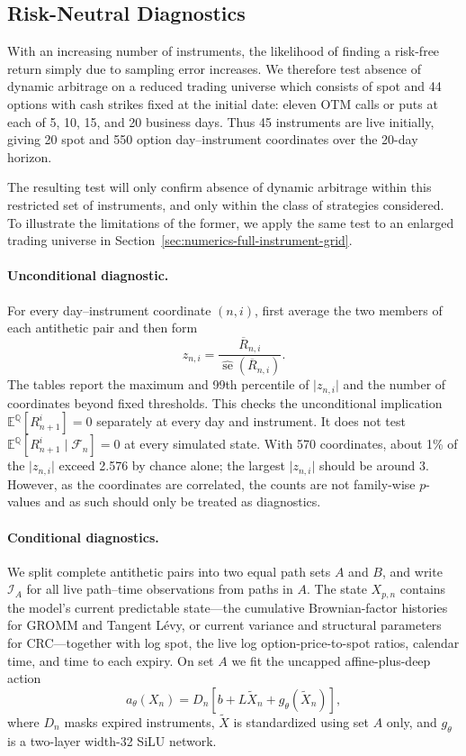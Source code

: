 \documentclass[11pt]{article}
\newcommand{\E}{\mathbb E}
\newcommand{\Q}{\mathbb Q}
\newcommand{\abs}[1]{\lvert #1\rvert}
\theoremstyle{plain}
\theoremstyle{definition}
\theoremstyle{remark}
\begin{document}
\subsection{Risk-Neutral Diagnostics}
\label{sec:numerics-audit-definition}
With an increasing number of instruments, the likelihood of finding a risk-free return simply due to sampling error increases. We therefore test absence of dynamic arbitrage on a reduced trading universe which consists of spot and
44 options with cash strikes fixed at the initial date: eleven OTM calls or
puts at each of 5, 10, 15, and 20 business days.  Thus 45 instruments are live
initially, giving 20 spot and 550 option day--instrument coordinates over the
20-day horizon. 

The resulting test will only confirm absence of dynamic arbitrage within this restricted set of instruments, 
and only within the class of strategies considered. To illustrate the limitations of the former,
we apply the same test to an enlarged trading universe
in Section~\ref{sec:numerics-full-instrument-grid}.

\paragraph{Unconditional diagnostic.}
For every day--instrument coordinate $(n,i)$, first average the two members of
each antithetic pair and then form
\begin{equation}\label{eq:numerics-z-score}
  z_{n,i}
  =\frac{\overline R_{n,i}}
  {\widehat{\operatorname{se}}(\overline R_{n,i})}.
\end{equation}
The tables report the maximum and 99th percentile of $\abs{z_{n,i}}$ and the
number of coordinates beyond fixed thresholds.  This checks the unconditional
implication $\E^\Q[R_{n+1}^i]=0$ separately at every day and instrument.  It
does not test $\E^\Q[R_{n+1}^i\mid\mathcal F_n]=0$ at every simulated state.
With 570 coordinates, about 1\% of the $\abs{z_{n,i}}$ exceed 2.576 by chance alone; the largest $\abs{z_{n,i}}$ should be around $3$. However, as the coordinates are correlated, the counts are not family-wise $p$-values and as such should only be treated as diagnostics. 

\paragraph{Conditional diagnostics.}
We split complete antithetic pairs into two equal path sets $A$ and $B$, and
write $\mathcal I_A$ for all live path--time observations from paths in $A$.
The state $X_{p,n}$ contains the model's current predictable state---the
cumulative Brownian-factor histories for GROMM and Tangent L\'evy, or current
variance and structural parameters for CRC---together with log spot, the live
log option-price-to-spot ratios, calendar time, and time to each expiry.  On
set $A$ we fit the uncapped affine-plus-deep action
\begin{equation}\label{eq:numerics-action-map}
  a_\theta(X_n)
  =D_n\left[b+L\widetilde X_n+g_\theta(\widetilde X_n)\right],
\end{equation}
where $D_n$ masks expired instruments, $\widetilde X$ is standardized using
set $A$ only, and $g_\theta$ is a two-layer width-32 SiLU network.
\end{document}
